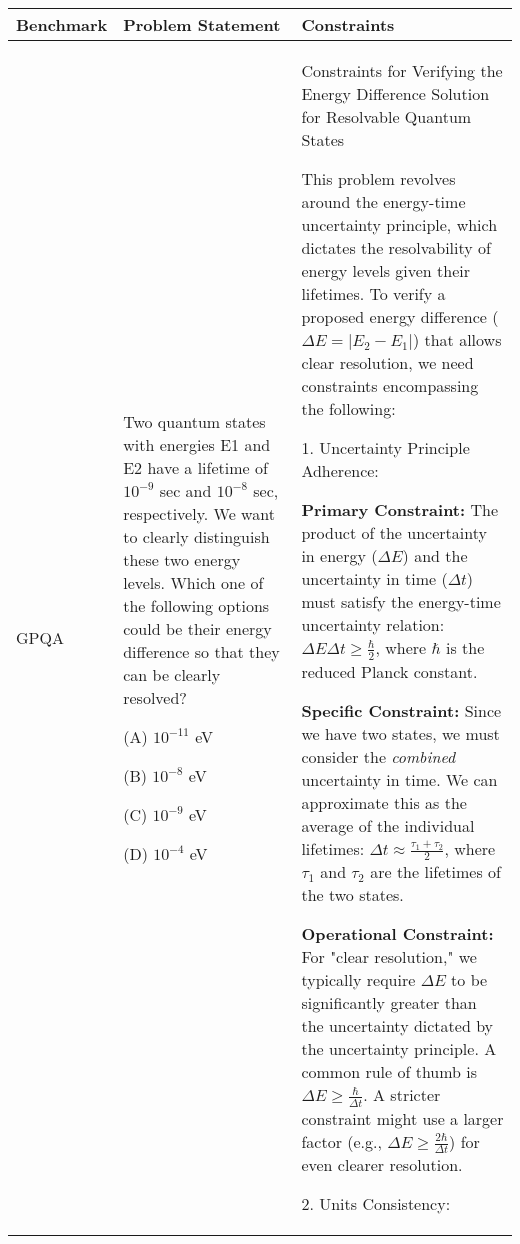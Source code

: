 \begin{table*}
\centering
\footnotesize
\renewcommand{\arraystretch}{1.2} %

\begin{tabularx}{\textwidth}{>{\raggedright}p{}|X|X}
\toprule
\textbf{Benchmark}   & \textbf{Problem Statement}  & \textbf{Constraints} \\ \midrule

GPQA & Two quantum states with energies E1 and E2 have a lifetime of $10^{-9}$ sec and $10^{-8}$ sec, respectively. We want to clearly distinguish these two energy levels. Which one of the following options could be their energy difference so that they can be clearly resolved?

(A) $10^{-11}$ eV

(B) $10^{-8}$ eV

(C) $10^{-9}$ eV

(D) $10^{-4}$ eV & 

Constraints for Verifying the Energy Difference Solution for Resolvable Quantum States

This problem revolves around the energy-time uncertainty principle, which dictates the resolvability of energy levels given their lifetimes. To verify a proposed energy difference ($\Delta E = |E_2 - E_1|$) that allows clear resolution, we need constraints encompassing the following:

1. Uncertainty Principle Adherence:

\textbf{Primary Constraint:} The product of the uncertainty in energy ($\Delta E$) and the uncertainty in time ($\Delta t$) must satisfy the energy-time uncertainty relation: $\Delta E \Delta t \geq \frac{\hbar}{2}$, where $\hbar$ is the reduced Planck constant.

\textbf{Specific Constraint:} Since we have two states, we must consider the \textit{combined} uncertainty in time. We can approximate this as the average of the individual lifetimes: $\Delta t \approx \frac{\tau_1 + \tau_2}{2}$, where $\tau_1$ and $\tau_2$ are the lifetimes of the two states.

\textbf{Operational Constraint:} For "clear resolution," we typically require $\Delta E$ to be significantly greater than the uncertainty dictated by the uncertainty principle. A common rule of thumb is $\Delta E \geq \frac{\hbar}{\Delta t}$. A stricter constraint might use a larger factor (e.g., $\Delta E \geq \frac{2\hbar}{\Delta t}$) for even clearer resolution.

2. Units Consistency:


\end{tabularx}
\end{table*}
